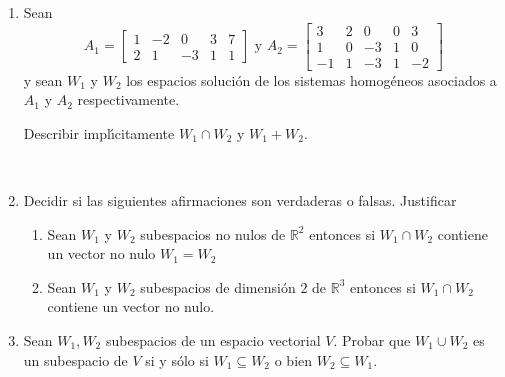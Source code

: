 \documentclass[11pt,spanish,makeidx]{amsbook}
\newcommand\R{\mathbb{R}}
\begin{document}
\begin{enumerate}
		
	\item Sean
	\[
	A_1=\begin{bmatrix}
	1&-2&0&3&7\\
	2&1&-3&1&1
	\end{bmatrix}\text { y }
	A_2=\begin{bmatrix}
	3&2&0&0&3\\
	1&0&-3&1&0 \\
	-1&1&-3&1&-2
	\end{bmatrix}
	\]
	y sean $W_1$ y $W_2$ los espacios soluci{\'o}n de los sistemas
	homog{\'e}neos asociados a $A_1$ y $A_2$ respectivamente.
	
	Describir impl{\'\i}citamente $W_1\cap W_2$ y $W_1+W_2$.
		
	\
	
	\item Decidir si las siguientes afirmaciones son verdaderas o falsas. Justificar
	\begin{enumerate}
		\item Sean $W_1$ y $W_2$ subespacios no nulos de $\R^2$ entonces si $W_1 \cap W_2$ contiene un vector no nulo $W_1 = W_2$
			\item Sean $W_1$ y $W_2$ subespacios de dimensi\'on $2$ de $\R^3$ entonces si $W_1 \cap W_2$ contiene un vector no nulo.
	\end{enumerate}
	
		
		\item Sean $W_1, W_2$ subespacios de un espacio vectorial $V$. Probar que $W_1 \cup W_2$ es un subespacio
		de $V$ si y s\'olo si $W_1 \subseteq W_2$ o bien $W_2 \subseteq W_1$.
			

	
	
	
\end{enumerate}
\end{document}
